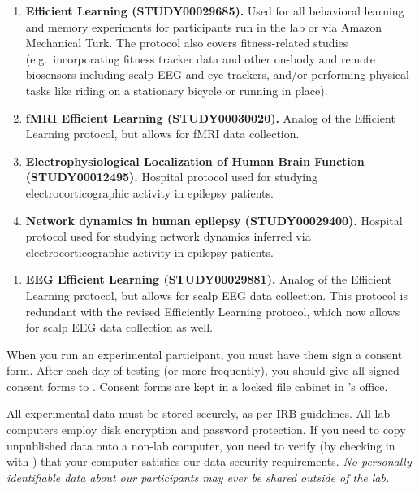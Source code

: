\documentclass{tufte-book} %
\begin{document}
 \begin{enumerate}
 \item \textbf{Efficient Learning (STUDY00029685).}  Used for all
   behavioral learning and memory experiments for participants run in
   the lab or via Amazon Mechanical Turk.  The protocol also covers
   fitness-related studies (e.g.\ incorporating fitness tracker data
   and other on-body and remote biosensors including scalp EEG and
   eye-trackers, and/or performing physical tasks like riding on a
   stationary bicycle or running in place).
    \item \textbf{fMRI Efficient Learning (STUDY00030020).}  Analog of
      the Efficient Learning protocol, but allows for fMRI data
      collection.
    \item \textbf{Electrophysiological Localization of Human Brain
        Function (STUDY00012495).}  Hospital protocol used for
      studying electrocorticographic activity in epilepsy patients.
    \item \textbf{Network dynamics in human epilepsy (STUDY00029400).}
      Hospital protocol used for studying network dynamics inferred
      via electrocorticographic activity in epilepsy patients.
   \end{enumerate}

 \begin{enumerate}
   \item \textbf{EEG Efficient Learning (STUDY00029881).} Analog of
     the Efficient Learning protocol, but allows for scalp EEG data
     collection.  This protocol is redundant with the revised
     Efficiently Learning protocol, which now allows for scalp EEG
     data collection as well.
   \end{enumerate}

   When you run an experimental participant, you must have them sign a
   consent form.  After each day of testing (or more frequently), you
   should give all signed consent forms to \coordinator.  Consent
   forms are kept in a locked file cabinet in \director 's office.

   All experimental data must be stored securely, as per IRB
   guidelines.  All lab computers employ disk encryption and password
   protection.  If you need to copy unpublished data onto a non-lab
   computer, you need to verify (by checking in with \director) that
   your computer satisfies our data security requirements.  \textit{No
   personally identifiable data about our participants may ever be
   shared outside of the lab.}
\end{document}
